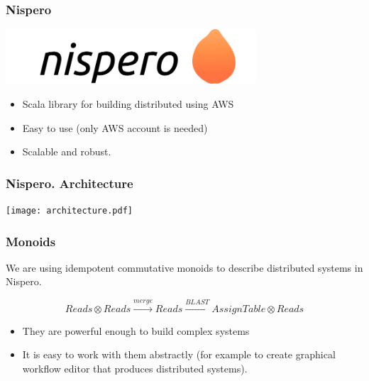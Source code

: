 \documentclass{beamer}
\begin{document}
\begin{frame}
\frametitle{Nispero}
\includegraphics[width=0.7\textwidth]{nispero.png}
\begin{itemize}
  \item Scala library for building distributed using AWS
  \item Easy to use (only AWS account is needed)
  \item Scalable and robust.
\end{itemize}
\end{frame}


\begin{frame}
\frametitle{Nispero. Architecture}
\hspace{0.05\textwidth}
\texttt{[image: architecture.pdf]}
\hspace{0.05\textwidth}

\end{frame}



\begin{frame}
\frametitle{Monoids}

We are using idempotent commutative monoids to describe distributed	systems in Nispero.


$$ Reads \otimes Reads \xrightarrow{merge} Reads \xrightarrow{BLAST} AssignTable \otimes Reads $$

\begin{itemize}
  \item They are powerful enough to build complex systems
  \item It is easy to work with them abstractly (for example to create graphical workflow editor that produces distributed systems).
\end{itemize}

\end{frame}
\end{document}
